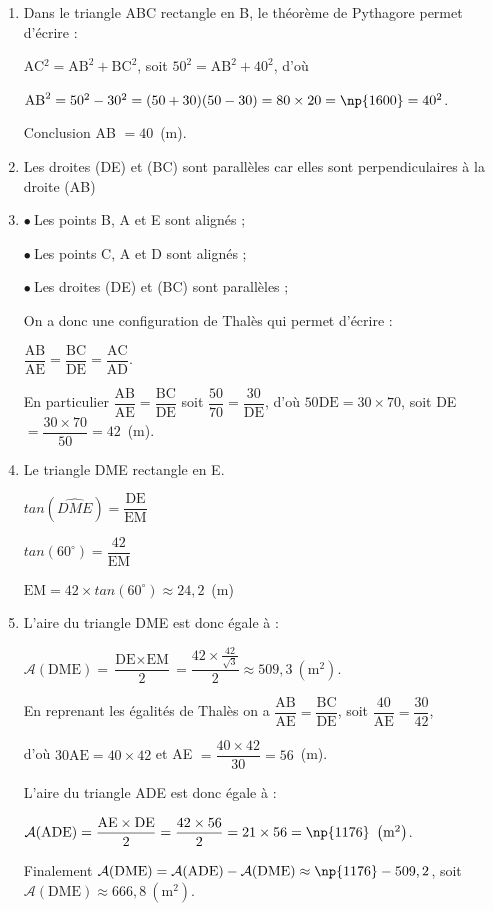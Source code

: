 \begin{enumerate}
\item %
Dans le triangle ABC rectangle en B, le théorème de Pythagore permet d'écrire :

AC$^2 = \text{AB}^2 + \text{BC}^2$, soit $50^2 = \text{AB}^2 + 40^2$, d'où 

$\text{AB}^2 = 50^2 - 30^2 = (50 + 30)(50 - 30) = 80 \times 20 = \np{1600} = 40^2$.

Conclusion AB $= 40$~(m).
\item %
Les droites (DE) et (BC) sont parallèles car elles sont perpendiculaires à la droite (AB)
\item %
$\bullet~$Les points B, A et E sont alignés ;

$\bullet~$Les points C, A et D sont alignés ;

$\bullet~$Les droites (DE) et (BC) sont parallèles ;

On a donc une configuration de Thalès qui permet d'écrire :

$\dfrac{\text{AB}}{\text{AE}} = \dfrac{\text{BC}}{\text{DE}} = \dfrac{\text{AC}}{\text{AD}}$.

En particulier $\dfrac{\text{AB}}{\text{AE}} = \dfrac{\text{BC}}{\text{DE}}$ soit $\dfrac{50}{70} = \dfrac{30}{\text{DE}}$, d'où $50\text{DE} = 30 \times 70$, soit DE $ = \dfrac{30 \times 70}{50} = 42$~(m).

\item %
Le triangle DME rectangle en E.

$tan(\widehat{DME})=\dfrac{\text{DE}}{\text{EM}}$

$tan(60^{\circ})=\dfrac{42}{\text{EM}}$

$\text{EM}=42\times tan(60^{\circ})\approx 24,2$~(m)
\item %
L'aire du triangle DME est donc égale à :

$\mathcal{A}(\text{DME}) = \dfrac{\text{DE} \times \text{EM}}{2} 
= \dfrac{42 \times \frac{42}{\sqrt{3}}}{2} \approx 509,3~\left(\text{m}^2\right)$.

En reprenant les égalités de Thalès on a $\dfrac{\text{AB}}{\text{AE}} = 
\dfrac{\text{BC}}{\text{DE}}$, soit $\dfrac{40}{\text{AE}} = \dfrac{\text{30}}{42}$,

d'où $30 \text{AE} = 40 \times 42$ et AE $ = \dfrac{40 \times 42}{30} = 56$~(m).

L'aire du triangle ADE est donc égale à :

$\mathcal{A}(\text{ADE}) = \dfrac{\text{AE} \times \text{DE}}{2} = \dfrac{42 \times 56}{2} = 21 \times 56 = \np{1176}~\left(\text{m}^2\right)$.

Finalement $\mathcal{A}(\text{DME}) = \mathcal{A}(\text{ADE}) - \mathcal{A}(\text{DME}) \approx \np{1176} - 509,2$, soit $\mathcal{A}(\text{DME}) \approx 666,8~\left(\text{m}^2\right)$.

\end{enumerate}

